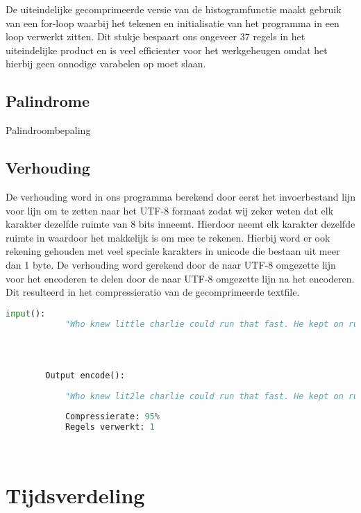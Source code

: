 \documentclass{article}
\begin{document}
      De uiteindelijke gecomprimeerde versie van de histogramfunctie maakt gebruik van een for-loop waarbij het tekenen en initialisatie van het programma in een loop verwerkt zitten. Dit stukje bespaart ons ongeveer 37 regels in het uiteindelijke product en is veel efficienter voor het werkgeheugen omdat het hierbij geen onnodige varabelen op moet slaan. 
    
    \subsection{Palindrome}
         Palindroombepaling
    
    \subsection{Verhouding}
        De verhouding word in ons programma berekend door eerst het invoerbestand lijn voor lijn om te zetten naar het UTF-8 formaat zodat wij zeker weten dat elk karakter dezelfde ruimte van 8 bits inneemt. Hierdoor neemt elk karakter dezelfde ruimte in waardoor het makkelijk is om mee te rekenen. Hierbij word er ook rekening gehouden met veel speciale karakters in unicode die bestaan uit meer dan 1 byte. De verhouding word gerekend door de  naar UTF-8 omgezette lijn voor het encoderen te delen door de naar UTF-8 omgezette lijn na het encoderen. Dit resulteerd in het compressieratio van de gecomprimeerde textfile. 
        
        \begin{lstlisting}[frame=single, language=python]  % Start your code-block
        input():
            "Who knew little charlie could run that fast. He kept on running faster fasteer and fasteeeeeerr !"
            
            
        
        
        Output encode():    
            
            "Who knew lit2le charlie could run that fast. He kept on run2ing faster faste2r and faste6r2 !"
                
            Compressierate: 95%
            Regels verwerkt: 1

            
        \end{lstlisting}

\section{Tijdsverdeling}
\end{document}
